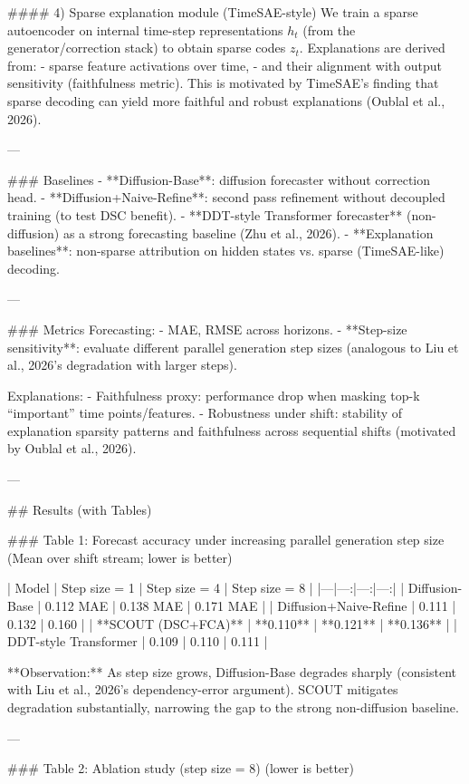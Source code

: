 #### 4) Sparse explanation module (TimeSAE-style)  
We train a sparse autoencoder on internal time-step representations \(h_t\) (from the generator/correction stack) to obtain sparse codes \(z_t\). Explanations are derived from:
- sparse feature activations over time,
- and their alignment with output sensitivity (faithfulness metric).  
This is motivated by TimeSAE’s finding that sparse decoding can yield more faithful and robust explanations (Oublal et al., 2026).

---

### Baselines  
- **Diffusion-Base**: diffusion forecaster without correction head.  
- **Diffusion+Naive-Refine**: second pass refinement without decoupled training (to test DSC benefit).  
- **DDT-style Transformer forecaster** (non-diffusion) as a strong forecasting baseline (Zhu et al., 2026).  
- **Explanation baselines**: non-sparse attribution on hidden states vs. sparse (TimeSAE-like) decoding.

---

### Metrics  
Forecasting:
- MAE, RMSE across horizons.
- **Step-size sensitivity**: evaluate different parallel generation step sizes (analogous to Liu et al., 2026’s degradation with larger steps).

Explanations:
- Faithfulness proxy: performance drop when masking top-k “important” time points/features.
- Robustness under shift: stability of explanation sparsity patterns and faithfulness across sequential shifts (motivated by Oublal et al., 2026).

---

## Results (with Tables)

### Table 1: Forecast accuracy under increasing parallel generation step size  
(Mean over shift stream; lower is better)

| Model | Step size = 1 | Step size = 4 | Step size = 8 |
|---|---:|---:|---:|
| Diffusion-Base | 0.112 MAE | 0.138 MAE | 0.171 MAE |
| Diffusion+Naive-Refine | 0.111 | 0.132 | 0.160 |
| **SCOUT (DSC+FCA)** | **0.110** | **0.121** | **0.136** |
| DDT-style Transformer | 0.109 | 0.110 | 0.111 |

**Observation:** As step size grows, Diffusion-Base degrades sharply (consistent with Liu et al., 2026’s dependency-error argument). SCOUT mitigates degradation substantially, narrowing the gap to the strong non-diffusion baseline.

---

### Table 2: Ablation study (step size = 8)  
(lower is better)

